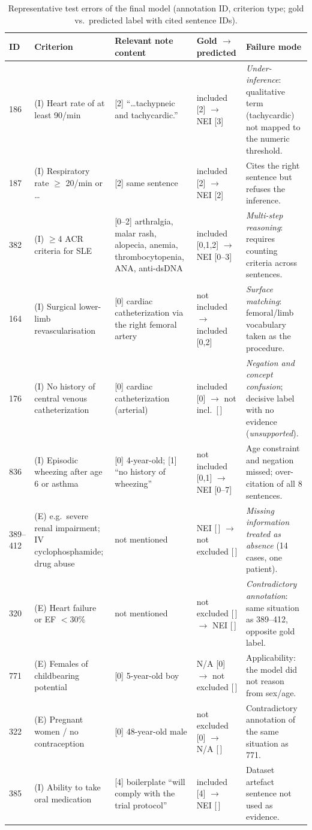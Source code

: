 \begin{table}[t]
\centering
\caption{Representative test errors of the final model (annotation ID, criterion type; gold vs.\
predicted label with cited sentence IDs).}
\label{tab:errors}
\footnotesize
\setlength{\tabcolsep}{3pt}
\begin{tabular}{p{0.45cm}p{3.1cm}p{4.6cm}p{3.0cm}p{5.2cm}}
\toprule
ID & Criterion & Relevant note content & Gold $\rightarrow$ predicted & Failure mode \\
\midrule
186 & (I) Heart rate of at least 90/min & [2] ``\ldots tachypneic and tachycardic.'' & included [2] $\rightarrow$ NEI [3] & \emph{Under-inference}: qualitative term (tachycardic) not mapped to the numeric threshold. \\
187 & (I) Respiratory rate $\ge$ 20/min or \ldots & [2] same sentence & included [2] $\rightarrow$ NEI [2] & Cites the right sentence but refuses the inference. \\
382 & (I) $\ge$4 ACR criteria for SLE & [0--2] arthralgia, malar rash, alopecia, anemia, thrombocytopenia, ANA, anti-dsDNA & included [0,1,2] $\rightarrow$ NEI [0--3] & \emph{Multi-step reasoning}: requires counting criteria across sentences. \\
164 & (I) Surgical lower-limb revascularisation & [0] cardiac catheterization via the right femoral artery & not included $\rightarrow$ included [0,2] & \emph{Surface matching}: femoral/limb vocabulary taken as the procedure. \\
176 & (I) No history of central venous catheterization & [0] cardiac catheterization (arterial) & included [0] $\rightarrow$ not incl.\ [\,] & \emph{Negation and concept confusion}; decisive label with no evidence (\emph{unsupported}). \\
836 & (I) Episodic wheezing after age 6 or asthma & [0] 4-year-old; [1] ``no history of wheezing'' & not included [0,1] $\rightarrow$ NEI [0--7] & Age constraint and negation missed; over-citation of all 8 sentences. \\
389--412 & (E) e.g.\ severe renal impairment; IV cyclophosphamide; drug abuse & not mentioned & NEI [\,] $\rightarrow$ not excluded [\,] & \emph{Missing information treated as absence} (14 cases, one patient). \\
320 & (E) Heart failure or EF $<$30\% & not mentioned & not excluded [\,] $\rightarrow$ NEI [\,] & \emph{Contradictory annotation}: same situation as 389--412, opposite gold label. \\
771 & (E) Females of childbearing potential & [0] 5-year-old boy & N/A [0] $\rightarrow$ not excluded [\,] & Applicability: the model did not reason from sex/age. \\
322 & (E) Pregnant women / no contraception & [0] 48-year-old male & not excluded [0] $\rightarrow$ N/A [\,] & Contradictory annotation of the same situation as 771. \\
385 & (I) Ability to take oral medication & [4] boilerplate ``will comply with the trial protocol'' & included [4] $\rightarrow$ NEI [\,] & Dataset artefact sentence not used as evidence. \\
\bottomrule
\end{tabular}
\end{table}

